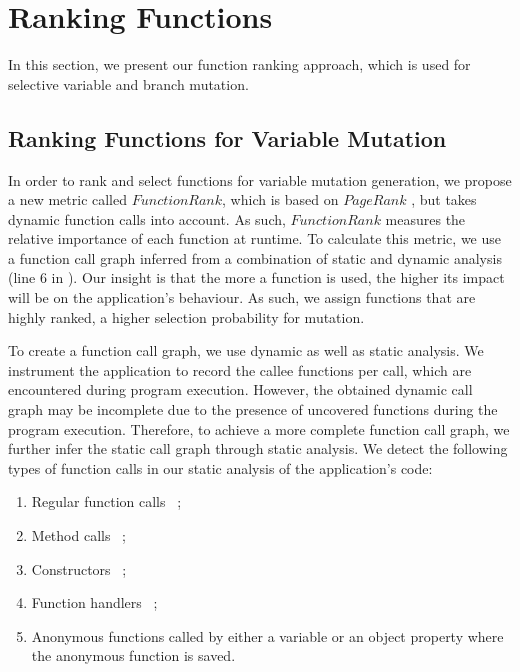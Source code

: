 \section{Ranking Functions} \label{Sec:ranking}
In this section, we present our function ranking approach, which is used for selective variable and branch mutation.

 
\subsection{Ranking Functions for Variable Mutation}
\label{Sec:rankfunc-var}

%
In order to rank and select functions for  variable mutation generation,  we propose a new metric called $FunctionRank$, which is based on $PageRank$  \cite{brin:cnis98}, but takes dynamic function calls into account. As such, $FunctionRank$ measures the relative importance of each function at runtime. %
To calculate this metric, we use a function call graph inferred from a combination of static and dynamic analysis (line 6 in ). Our insight is that the more a function is used, the higher its impact will be on the application's behaviour. As such, we assign functions that are highly ranked, a higher selection probability for mutation.

 \label{Sec:functionCallGraph}
To create a function call graph, we use dynamic as well as static analysis.
We instrument the application to record the callee functions per call, which are  encountered during program execution.
However, the obtained dynamic call graph may be incomplete due to the presence of uncovered functions during the program execution.
Therefore, to achieve a more complete function call graph, we further infer the static call graph through static analysis. 
We detect the following types of function calls in our static analysis of the application's code:

\begin{enumerate}
 \item Regular function calls \eg~;
 \item Method calls \eg~;
 \item Constructors \eg~;
 \item Function handlers \eg~;
 \item Anonymous functions called by either a variable or an object property where the anonymous function is saved.
\end{enumerate}

